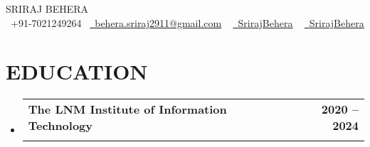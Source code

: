 \documentclass[letterpaper,11pt]{article}
\makeatletter
\newcommand{\resumeSubheading}[4]{
  \vspace{-2pt}\item
    \begin{tabular*}{1.0\textwidth}[t]{l@{\extracolsep{\fill}}r}
      \textbf{#1} & \textbf{\small #2} \\
      \text{\small#3} & \text{\small #4} \\
    \end{tabular*}\vspace{-7pt}
}
\newcommand{\resumeSubHeadingListStart}{\begin{itemize}[leftmargin=0.0in, label={}]}
\newcommand{\resumeSubHeadingListEnd}{\end{itemize}}
\makeatother
\begin{document}

\begin{center}
    {\Huge \scshape SRIRAJ BEHERA} \\ \vspace{2pt}
    \small \raisebox{-0.1\height}\faPhone\ +91-7021249264~
    \href{mailto:behera.sriraj2911@gmail.com}{\raisebox{-0.2\height}\faEnvelope\  \underline{behera.sriraj2911@gmail.com}} ~ 
    \href{https://www.linkedin.com/in/sriraj-behera-730b23201/}{\raisebox{-0.2\height}\faLinkedin\ \underline{SrirajBehera}}  ~
    \href{https://github.com/SrirajBehera}{\raisebox{-0.2\height}\faGithub\ \underline{SrirajBehera}}
    \vspace{-8pt}
\end{center}


\section{EDUCATION}
  \resumeSubHeadingListStart
    \resumeSubheading
      {The LNM Institute of Information Technology}{2020 -- 2024} 
      {Bachelor of Technology (B. Tech.) in Computer Science and Engineering - 8.36 CGPA}{Jaipur, Rajasthan, India}
  \resumeSubHeadingListEnd

\end{document}
